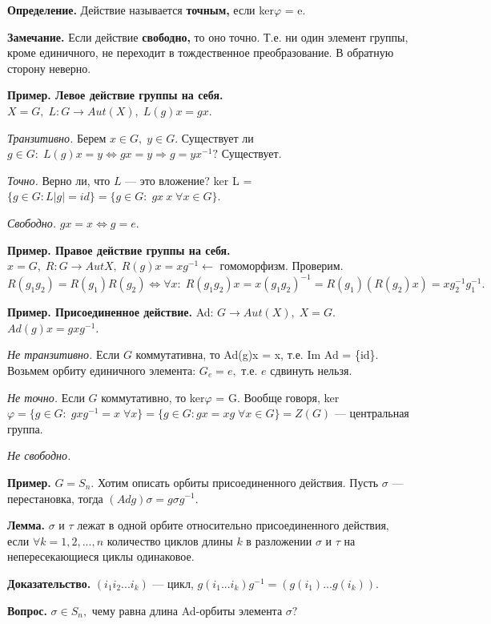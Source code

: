 \documentclass[12pt,a4paper]{article}
\begin{document}
\textbf{Определение.} Действие называется \textbf{точным,} если ker$\varphi$ = e. 

\textbf{Замечание.} Если действие \textbf{свободно,} то оно точно. Т.е. ни один элемент группы, кроме единичного, не переходит в тождественное преобразование. В обратную сторону неверно. 

\textbf{Пример. Левое действие группы на себя.} $X = G, \; L: G \to Aut(X), \; L(g)x = gx.$ 

\textit{Транзитивно.} Берем $x \in G, \; y \in G.$ Существует ли $g \in G: \; L(g)x = y \Leftrightarrow gx = y \Rightarrow g = yx^{-1}?$ Существует.

\textit{Точно.} Верно ли, что $L$ --- это вложение? ker L = $\{g \in G: L|g| = id\} = \{g \in G: \; gx \ x \; \forall x \in G\}.$ 

\textit{Свободно.} $gx = x \Leftrightarrow g = e.$ 

\textbf{Пример. Правое действие группы на себя.} $x = G, \; R: G \to Aut X, \; R(g)x = xg^{-1} \leftarrow$ гомоморфизм. Проверим. $R(g_{1}g_{2}) = R(g_{1})R(g_{2}) \Leftrightarrow \forall x: \; R(g_{1}g_{2})x = x(g_{1}g_{2})^{-1} = R(g_{1})(R(g_{2})x) = xg_{2}^{-1}g_{1}^{-1}.$ 

\textbf{Пример. Присоединенное действие.} Ad: $G \to Aut(X), \; X = G.$ $Ad(g)x = gxg^{-1}.$ 

\textit{Не транзитивно.} Если $G$ коммутативна, то Ad(g)x = x, т.е. Im Ad = \{id\}. Возьмем орбиту единичного элемента: $G_{e} = e,$ т.е. $e$ сдвинуть нельзя. 

\textit{Не точно.} Если $G$ коммутативно, то ker$\varphi$ = G. Вообще говоря, ker $\varphi = \{g \in G: \; gxg^{-1} = x \; \forall x\} = \{g \in G: gx = xg \; \forall x \in G\} = Z(G)$ --- центральная группа. 

\textit{Не свободно.}

\textbf{Пример.} $G = S_{n}.$ Хотим описать орбиты присоединенного действия. Пусть $\sigma$ --- перестановка, тогда $(Adg)\sigma = g \sigma g^{-1}.$ 

\textbf{Лемма.} $\sigma$ и $\tau$ лежат в одной орбите относительно присоединенного действия, если $\forall k = 1, 2, ..., n$ количество циклов длины $k$ в разложении $\sigma$ и $\tau$ на непересекающиеся циклы одинаковое. 

\textbf{Доказательство.} $(i_{1}i_{2}...i_{k})$ --- цикл, $g(i_{1}...i_{k})g^{-1} = (g(i_{1})...g(i_{k})).$ 

\textbf{Вопрос.} $\sigma \in S_{n},$ чему равна длина Ad-орбиты элемента $\sigma?$
\end{document}
